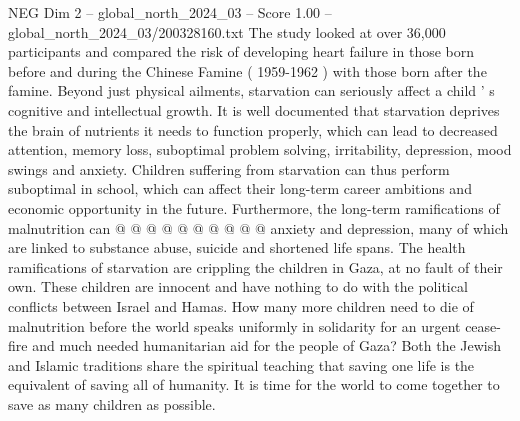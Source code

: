 \begin{textsample}{NEG Dim 2 – global\_north\_2024\_03 – Score 1.00 – global\_north\_2024\_03/200328160.txt}
The study looked at over 36,000 participants and compared the risk of developing heart failure in those born before and during the Chinese Famine ( 1959-1962 ) with those born after the famine.
Beyond just physical ailments, starvation can seriously affect a child ' s cognitive and intellectual growth.
It is well documented that starvation deprives the brain of nutrients it needs to function properly, which can lead to decreased attention, memory loss, suboptimal problem solving, irritability, depression, mood swings and anxiety.
Children suffering from starvation can thus perform suboptimal in school, which can affect their long-term career ambitions and economic opportunity in the future.
Furthermore, the long-term ramifications of malnutrition can @ @ @ @ @ @ @ @ @ @ anxiety and depression, many of which are linked to substance abuse, suicide and shortened life spans.
The health ramifications of starvation are crippling the children in Gaza, at no fault of their own.
These children are innocent and have nothing to do with the political conflicts between Israel and Hamas.
How many more children need to die of malnutrition before the world speaks uniformly in solidarity for an urgent cease-fire and much needed humanitarian aid for the people of Gaza?
Both the Jewish and Islamic traditions share the spiritual teaching that saving one life is the equivalent of saving all of humanity.
It is time for the world to come together to save as many children as possible.

\end{textsample}
